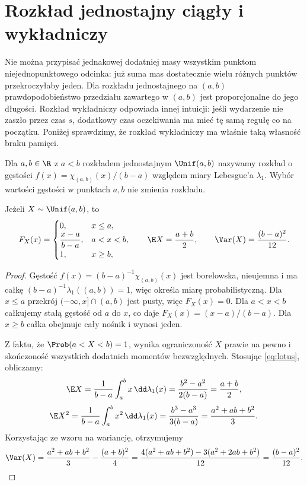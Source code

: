 \section{Rozkład jednostajny ciągły i wykładniczy}
Nie można przypisać jednakowej dodatniej masy wszystkim
punktom niejednopunktowego odcinka: już suma mas dostatecznie
wielu różnych punktów przekroczyłaby jeden.
Dla rozkładu jednostajnego na $(a,b)$ prawdopodobieństwo
przedziału zawartego w $(a,b)$ jest proporcjonalne do jego
długości. Rozkład wykładniczy odpowiada innej intuicji:
jeśli wydarzenie nie zaszło przez czas $s$, dodatkowy czas
oczekiwania ma mieć tę samą regułę co na początku.
Poniżej sprawdzimy, że rozkład wykładniczy ma właśnie
taką własność braku pamięci.

\begin{definicja}
Dla $a,b\in\R$ z $a<b$ rozkładem jednostajnym
$\Unif(a,b)$ nazywamy rozkład o gęstości
$f(x)=\chi_{(a,b)}(x)/(b-a)$ względem miary Lebesgue'a
$\lambda_1$. Wybór wartości gęstości w punktach $a,b$
nie zmienia rozkładu.
\end{definicja}

\begin{stwierdzenie}
Jeżeli $X\sim\Unif(a,b)$, to
\[
F_X(x)=\begin{cases}
0,&x\leq a,\\
\dfrac{x-a}{b-a},&a<x<b,\\
1,&x\geq b,
\end{cases}
\qquad
\E X=\frac{a+b}{2},\qquad
\Var(X)=\frac{(b-a)^2}{12}.
\]
\end{stwierdzenie}
\begin{proof}
Gęstość $f(x)=(b-a)^{-1}\chi_{(a,b)}(x)$
jest borelowska, nieujemna i ma całkę
$(b-a)^{-1}\lambda_1((a,b))=1$, więc określa
miarę probabilistyczną.
Dla $x\leq a$ przekrój $(-\infty,x]\cap(a,b)$ jest pusty,
więc $F_X(x)=0$.
Dla $a<x<b$ całkujemy stałą gęstość od $a$ do $x$,
co daje $F_X(x)=(x-a)/(b-a)$.
Dla $x\geq b$ całka obejmuje cały nośnik i wynosi jeden.

Z faktu, że $\Prob(a<X<b)=1$, wynika ograniczoność $X$
prawie na pewno i skończoność wszystkich dodatnich momentów
bezwzględnych. Stosując \eqref{eq:lotus}, obliczamy:
\[
\E X=\frac1{b-a}\int_a^b x\,\dd\lambda_1(x)
=\frac{b^2-a^2}{2(b-a)}=\frac{a+b}2,
\]
\[
\E X^2=\frac1{b-a}\int_a^b x^2\,\dd\lambda_1(x)
=\frac{b^3-a^3}{3(b-a)}=\frac{a^2+ab+b^2}3.
\]
Korzystając ze wzoru na wariancję, otrzymujemy
\[
\Var(X)=\frac{a^2+ab+b^2}{3}-\frac{(a+b)^2}{4}
=\frac{4(a^2+ab+b^2)-3(a^2+2ab+b^2)}{12}
=\frac{(b-a)^2}{12}.
\]
\end{proof}

